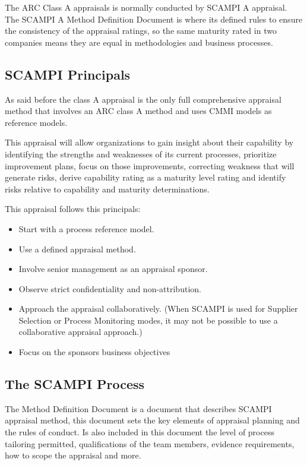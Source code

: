 The ARC Class A appraisals is normally conducted by SCAMPI A appraisal. The SCAMPI A Method Definition Document is where its defined rules to ensure the consistency of the appraisal ratings, so the same maturity rated in two companies means they are equal in methodologies and business processes.


\subsection{SCAMPI Principals}
As said before the class A appraisal is the only full comprehensive appraisal method that involves an ARC class A method and uses CMMI models as reference models.

This appraisal will allow organizations to gain insight about their capability by identifying the strengths and weaknesses of its current processes, prioritize improvement plans, focus on those improvements, correcting weakness that will generate risks, derive capability rating as a maturity level rating and identify risks relative to capability and maturity determinations.

This appraisal follows this principals:
\begin{itemize}
	\item Start with a process reference model.
	\item Use a defined appraisal method.
	\item Involve senior management as an appraisal sponsor.
	\item Observe strict confidentiality and non-attribution.
	\item Approach the appraisal collaboratively. (When SCAMPI is used for Supplier Selection or Process Monitoring modes, it may not be
	possible to use a collaborative appraisal approach.)
	\item Focus on the sponsors business objectives
\end{itemize}

\subsection{The SCAMPI Process}

The Method Definition Document is a document that describes SCAMPI appraisal method, this document sets the key elements of appraisal planning and the rules of conduct. Is also included in this document the level of process tailoring permitted, qualifications of the team members, evidence requirements, how to scope the appraisal and more.

